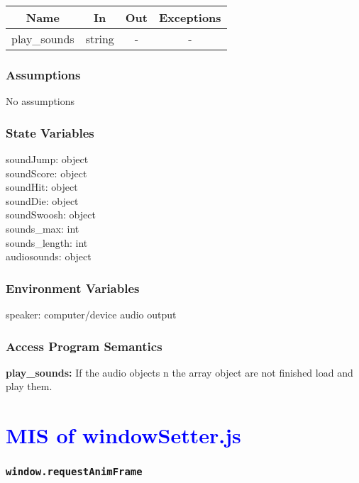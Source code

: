 \documentclass[11pt, oneside]{article}   	%
\begin{document}
\begin{center}
\begin{tabular}{ |c|c|c|c| } 
 \hline
 Name & In & Out & Exceptions \\ 
 \hline \hline
 play\_sounds & string & - & - \\ 
 \hline
\end{tabular}
\end{center}

\subsubsection{Assumptions}
No assumptions

\subsubsection{State Variables}
soundJump: object\\
soundScore: object\\
soundHit: object\\
soundDie: object\\
soundSwoosh: object\\
sounds\_max: int\\
sounds\_length: int\\
audiosounds: object\\
\subsubsection{Environment Variables}
speaker: computer/device audio output

\subsubsection{Access Program Semantics} 
 \textbf{play\_sounds:} If the audio objects n the array object are not finished load and play them.
 
 
 
 

\section{\textcolor{blue}{MIS of windowSetter.js}}
\subsubsection{\texttt{window.requestAnimFrame}}
\end{document}
